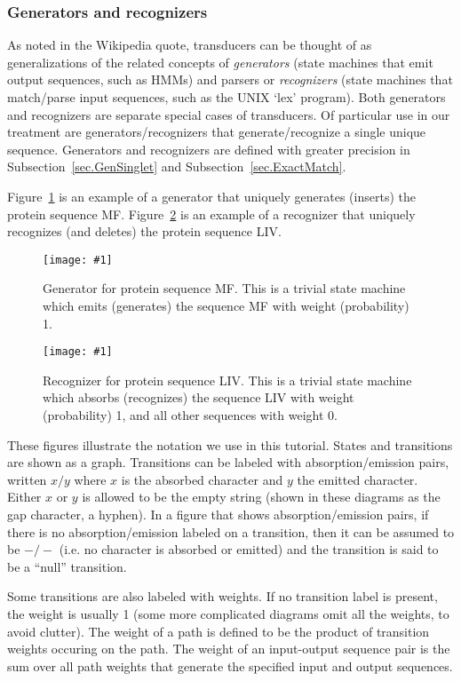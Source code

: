 \documentclass{article}
\newcommand{\secref}[1]{Subsection~\ref{sec.#1}}
\newcommand{\figref}[1]{Figure~\ref{Figures.#1}}
\newcommand{\figlabel}[1]{\label{Figures.#1}}
\newcommand{\easyfig}[4]{
\begin{figure}
\texttt{[image: \#1]}
\caption{ \figlabel{#3} #4}
\end{figure}}
\newcommand{\pngfig}[2]{\easyfig{#1.png}{}{#1}{#2}}
\begin{document}
\subsubsection{Generators and recognizers}

As noted in the Wikipedia quote, transducers can be thought of as generalizations of the related
concepts of {\em generators} (state machines that emit output sequences, such as HMMs)
and parsers or {\em recognizers} (state machines that match/parse input sequences, such as the UNIX `lex' program).
Both generators and recognizers are separate special cases of transducers.
Of particular use in our treatment are generators/recognizers that generate/recognize a single unique sequence.
Generators and recognizers are defined with greater precision in \secref{GenSinglet} and \secref{ExactMatch}.


\figref{mf-generator} is an example of a generator that uniquely generates (inserts) the protein sequence MF.
\figref{liv-small} is an example of a recognizer that uniquely recognizes (and deletes) the protein sequence LIV.

\pngfig{mf-generator}{Generator for protein sequence MF.  
This is a trivial state machine which emits (generates) the sequence MF with weight (probability) 1. }

\pngfig{liv-small}{Recognizer for protein sequence LIV.
This is a trivial state machine which absorbs (recognizes) the sequence LIV with weight (probability) 1, and all other sequences with weight 0.  }

These figures illustrate the notation we use in this tutorial.
States and transitions are shown as a graph.
Transitions can be labeled with absorption/emission pairs,
written $x/y$ where $x$ is the absorbed character and $y$ the emitted character.
Either $x$ or $y$ is allowed to be the empty string (shown in these diagrams as the gap character, a hyphen).
In a figure that shows absorption/emission pairs,
if there is no absorption/emission labeled on a transition, then it can be assumed to be $-/-$
(i.e. no character is absorbed or emitted) and the transition is said to be a ``null'' transition.

Some transitions are also labeled with weights.
If no transition label is present, the weight is usually 1
(some more complicated diagrams omit all the weights, to avoid clutter).
The weight of a path is defined to be the  product of transition weights occuring on the path. 
The weight of an input-output sequence pair is the sum over all path weights that generate the
specified  input and output sequences.  
\end{document}
